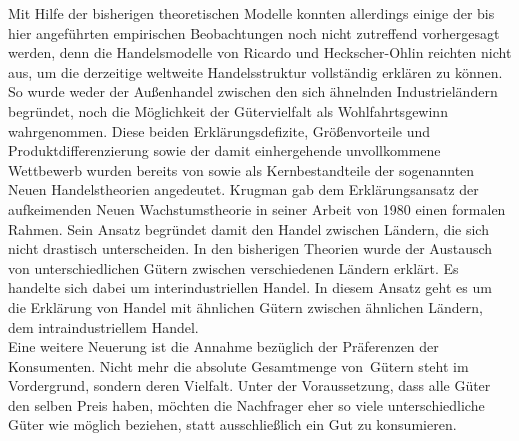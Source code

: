 %
Mit Hilfe der bisherigen theoretischen Modelle konnten allerdings einige der bis hier angeführten empirischen Beobachtungen noch nicht zutreffend vorhergesagt werden, denn die Handelsmodelle von Ricardo und Heckscher-Ohlin reichten nicht aus, um die derzeitige weltweite Handelsstruktur vollständig erklären zu können. So wurde weder der Außenhandel zwischen den sich ähnelnden Industrieländern begründet, noch die Möglichkeit der Gütervielfalt als Wohlfahrtsgewinn wahrgenommen. Diese beiden Erklärungsdefizite, Größenvorteile und Produktdifferenzierung sowie der damit einhergehende unvollkommene Wettbewerb wurden bereits von \cite{Balassa.1967} sowie \cite{Grubel.1967,Grubel.1970} als Kernbestandteile der sogenannten Neuen Handelstheorien angedeutet. Krugman gab dem Erklärungsansatz der aufkeimenden Neuen Wachstumstheorie in seiner Arbeit von 1980 einen formalen Rahmen.
Sein Ansatz begründet damit den Handel zwischen Ländern, die sich nicht drastisch unterscheiden. In den bisherigen Theorien wurde der Austausch von unterschiedlichen Gütern zwischen verschiedenen Ländern erklärt. Es handelte sich dabei um interindustriellen Handel. In diesem Ansatz geht es um die Erklärung von Handel mit ähnlichen Gütern zwischen ähnlichen Ländern, dem intraindustriellem Handel. \\
%
 Eine weitere Neuerung ist die Annahme bezüglich der Präferenzen der Konsumenten. Nicht mehr die absolute Gesamtmenge von~Gütern steht im Vordergrund, sondern deren Vielfalt. Unter der Voraussetzung, dass alle Güter den selben Preis haben, möchten die  Nachfrager eher so viele unterschiedliche Güter wie möglich beziehen, statt ausschließlich ein Gut zu konsumieren. \\
%
